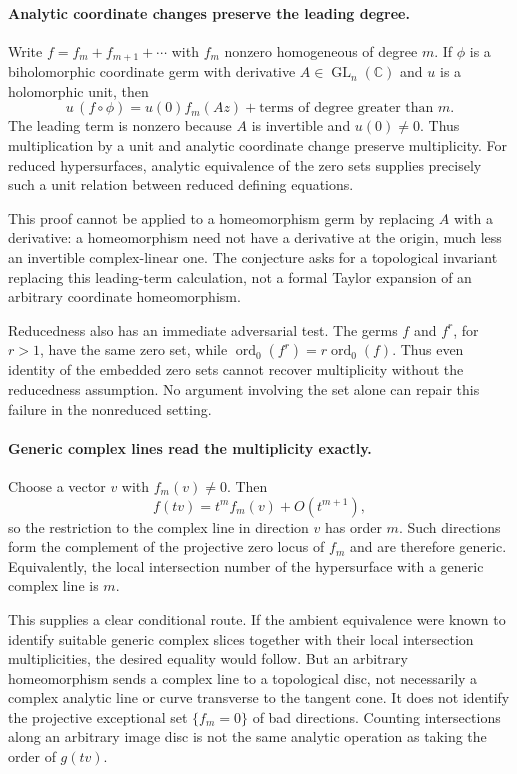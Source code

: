 \documentclass[11pt]{article}
\begin{document}
\paragraph{Analytic coordinate changes preserve the leading degree.}
Write $f=f_m+f_{m+1}+\cdots$ with $f_m$ nonzero homogeneous of degree $m$. If $\phi$ is a biholomorphic coordinate germ with derivative $A\in\operatorname{GL}_n(\mathbb C)$ and $u$ is a holomorphic unit, then
\[
 u\,(f\circ\phi)=u(0)f_m(Az)+\text{terms of degree greater than }m.
\]
The leading term is nonzero because $A$ is invertible and $u(0)\ne0$. Thus multiplication by a unit and analytic coordinate change preserve multiplicity. For reduced hypersurfaces, analytic equivalence of the zero sets supplies precisely such a unit relation between reduced defining equations.

This proof cannot be applied to a homeomorphism germ by replacing $A$ with a derivative: a homeomorphism need not have a derivative at the origin, much less an invertible complex-linear one. The conjecture asks for a topological invariant replacing this leading-term calculation, not a formal Taylor expansion of an arbitrary coordinate homeomorphism.

Reducedness also has an immediate adversarial test. The germs $f$ and $f^r$, for $r>1$, have the same zero set, while $\operatorname{ord}_0(f^r)=r\operatorname{ord}_0(f)$. Thus even identity of the embedded zero sets cannot recover multiplicity without the reducedness assumption. No argument involving the set alone can repair this failure in the nonreduced setting.

\paragraph{Generic complex lines read the multiplicity exactly.}
Choose a vector $v$ with $f_m(v)\ne0$. Then
\[
 f(tv)=t^m f_m(v)+O(t^{m+1}),
\]
so the restriction to the complex line in direction $v$ has order $m$. Such directions form the complement of the projective zero locus of $f_m$ and are therefore generic. Equivalently, the local intersection number of the hypersurface with a generic complex line is $m$.

This supplies a clear conditional route. If the ambient equivalence were known to identify suitable generic complex slices together with their local intersection multiplicities, the desired equality would follow. But an arbitrary homeomorphism sends a complex line to a topological disc, not necessarily a complex analytic line or curve transverse to the tangent cone. It does not identify the projective exceptional set $\{f_m=0\}$ of bad directions. Counting intersections along an arbitrary image disc is not the same analytic operation as taking the order of $g(tv)$.
\end{document}
